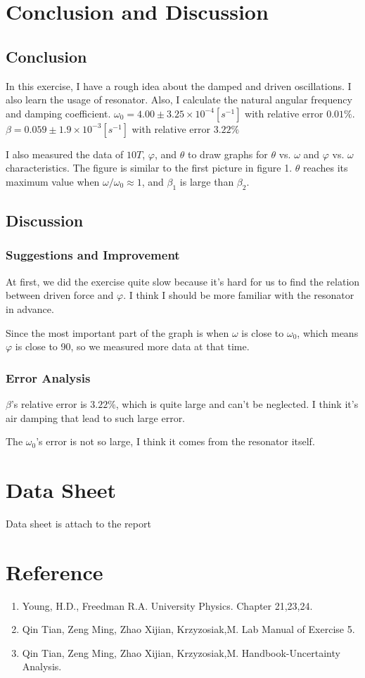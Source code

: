 \documentclass[12pt]{article}
\begin{document}
\section{Conclusion and Discussion}
\subsection{Conclusion}
In this exercise, I have a rough idea about the damped and driven oscillations. I also learn the usage of resonator.	Also, I calculate the natural angular frequency and damping coefficient. $\omega_0=4.00\pm3.25\times10^{-4}[s^{-1}]$ with relative error $0.01\%$.
$\beta=0.059\pm1.9\times10^{-3}[s^{-1}]$ with relative error $3.22\%$
\par I also measured the data of $10T$, $\varphi$, and $\theta$ to draw graphs for $\theta$ vs. $\omega$ and $\varphi$ vs. $\omega$ characteristics. The figure is similar to the first picture in figure 1. $\theta$ reaches its maximum value when $\omega/\omega_0\approx1$, and $\beta_1$ is large than $\beta_2$.
\subsection{Discussion}
\subsubsection{Suggestions and Improvement}
At first, we did the exercise quite slow because it's hard for us to find the relation between driven force and $\varphi$. I think I should be more familiar with the resonator in advance.
\par Since the most important part of the graph is when $\omega$ is close to $\omega_0$, which means $\varphi$ is close to 90, so we measured more data at that time. 
\subsubsection{Error Analysis}
$\beta$'s relative error is $3.22\%$, which is quite large and can't be neglected. I think it's air damping that lead to such large error.
\par The $\omega_0$'s error is not so large, I think it comes from the resonator itself.
\section{Data Sheet}
Data sheet is attach to the report
\section{Reference}
\begin{enumerate}[-]
\item Young, H.D., Freedman R.A. University Physics. Chapter 21,23,24.
\item Qin Tian, Zeng Ming, Zhao Xijian, Krzyzosiak,M. Lab Manual of Exercise 5.
\item Qin Tian, Zeng Ming, Zhao Xijian, Krzyzosiak,M. Handbook-Uncertainty Analysis.
\end{enumerate}
\end{document}
